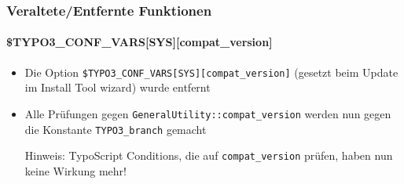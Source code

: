 %

\begin{frame}[fragile]
	\frametitle{Veraltete/Entfernte Funktionen}
	\framesubtitle{\$TYPO3\_CONF\_VARS[SYS][compat\_version]}

	\begin{itemize}

		\item Die Option \texttt{\$TYPO3\_CONF\_VARS[SYS][compat\_version]} (gesetzt
			beim Update im Install Tool wizard) wurde entfernt

		\item Alle Prüfungen gegen \texttt{GeneralUtility::compat\_version} werden
			nun gegen die Konstante \texttt{TYPO3\_branch} gemacht

			\vspace{0.2cm}

			\begingroup
				\color{red}
					Hinweis: TypoScript Conditions, die auf \texttt{compat\_version}
					prüfen, haben nun keine Wirkung mehr!
			\endgroup

	\end{itemize}

\end{frame}


